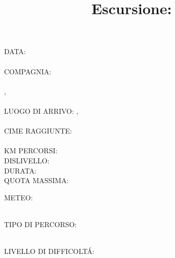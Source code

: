 \documentclass{article}
\title{\Huge Escursione: }
\date{}
\author{}
\begin{document}




\maketitle

\begin{minipage}[t]{0.5\textwidth}
    \faCalendar* DATA: \\
    \\
    \faSmile[regular] COMPAGNIA: \\
    \\
    \faMapPin[regular] , \\
    \\
    \faMapPin[regular] LUOGO DI ARRIVO: ,\\
    \\
    \faMountain[regular] CIME RAGGIUNTE:\\
    \vspace*{1cm}\\
    KM PERCORSI: \\
    DISLIVELLO: \\
    DURATA: \\
    QUOTA MASSIMA: \\
\end{minipage} 
\begin{minipage}[t]{0.4\textwidth}
    METEO: \\ \\

    TIPO DI PERCORSO: \\ \\

    LIVELLO DI DIFFICOLT\'A: \\ \\

\end{minipage}
\end{document}
